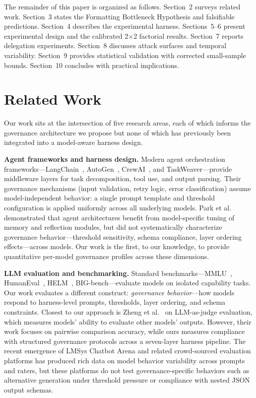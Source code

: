 \documentclass[11pt,a4paper]{article}
\begin{document}
The remainder of this paper is organized as follows. Section~2 surveys related work. Section~3 states the Formatting Bottleneck Hypothesis and falsifiable predictions. Section~4 describes the experimental harness. Sections~5--6 present experimental design and the calibrated 2$\times$2 factorial results. Section~7 reports delegation experiments. Section~8 discusses attack surfaces and temporal variability. Section~9 provides statistical validation with corrected small-sample bounds. Section~10 concludes with practical implications.

\section{Related Work}

Our work sits at the intersection of five research areas, each of which informs the governance architecture we propose but none of which has previously been integrated into a model-aware harness design.

\textbf{Agent frameworks and harness design.} Modern agent orchestration frameworks---LangChain~\cite{langchain}, AutoGen~\cite{autogen}, CrewAI~\cite{crewai}, and TaskWeaver---provide middleware layers for task decomposition, tool use, and output parsing. Their governance mechanisms (input validation, retry logic, error classification) assume model-independent behavior: a single prompt template and threshold configuration is applied uniformly across all underlying models. Park et al.~\cite{park2023generative} demonstrated that agent architectures benefit from model-specific tuning of memory and reflection modules, but did not systematically characterize governance behavior---threshold sensitivity, schema compliance, layer ordering effects---across models. Our work is the first, to our knowledge, to provide quantitative per-model governance profiles across these dimensions.

\textbf{LLM evaluation and benchmarking.} Standard benchmarks---MMLU~\cite{hendrycks2021}, HumanEval~\cite{chen2021}, HELM~\cite{liang2023}, BIG-bench---evaluate models on isolated capability tasks. Our work evaluates a different construct: \textit{governance behavior}---how models respond to harness-level prompts, thresholds, layer ordering, and schema constraints. Closest to our approach is Zheng et al.~\cite{zheng2023judging} on LLM-as-judge evaluation, which measures models' ability to evaluate other models' outputs. However, their work focuses on pairwise comparison accuracy, while ours measures compliance with structured governance protocols across a seven-layer harness pipeline. The recent emergence of LMSys Chatbot Arena and related crowd-sourced evaluation platforms has produced rich data on model behavior variability across prompts and raters, but these platforms do not test governance-specific behaviors such as alternative generation under threshold pressure or compliance with nested JSON output schemas.
\end{document}
